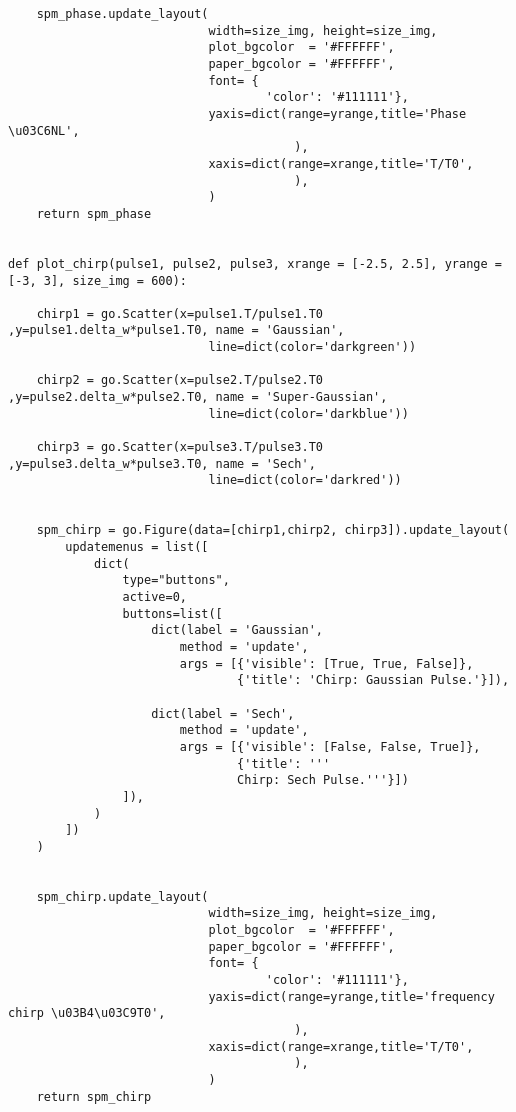 \begin{verbatim}
    spm_phase.update_layout( 
                            width=size_img, height=size_img,
                            plot_bgcolor  = '#FFFFFF',
                            paper_bgcolor = '#FFFFFF',
                            font= {
                                    'color': '#111111'},
                            yaxis=dict(range=yrange,title='Phase \u03C6NL', 
                                        ), 
                            xaxis=dict(range=xrange,title='T/T0', 
                                        ), 
                            )
    return spm_phase


def plot_chirp(pulse1, pulse2, pulse3, xrange = [-2.5, 2.5], yrange = [-3, 3], size_img = 600):

    chirp1 = go.Scatter(x=pulse1.T/pulse1.T0 ,y=pulse1.delta_w*pulse1.T0, name = 'Gaussian',
                            line=dict(color='darkgreen'))
    
    chirp2 = go.Scatter(x=pulse2.T/pulse2.T0 ,y=pulse2.delta_w*pulse2.T0, name = 'Super-Gaussian',
                            line=dict(color='darkblue'))

    chirp3 = go.Scatter(x=pulse3.T/pulse3.T0 ,y=pulse3.delta_w*pulse3.T0, name = 'Sech',
                            line=dict(color='darkred'))


    spm_chirp = go.Figure(data=[chirp1,chirp2, chirp3]).update_layout( 
        updatemenus = list([
            dict(
                type="buttons",
                active=0,
                buttons=list([   
                    dict(label = 'Gaussian',
                        method = 'update',
                        args = [{'visible': [True, True, False]},
                                {'title': 'Chirp: Gaussian Pulse.'}]), 

                    dict(label = 'Sech',
                        method = 'update',
                        args = [{'visible': [False, False, True]},
                                {'title': '''
                                Chirp: Sech Pulse.'''}])  
                ]),
            )
        ])
    )


    spm_chirp.update_layout( 
                            width=size_img, height=size_img,
                            plot_bgcolor  = '#FFFFFF',
                            paper_bgcolor = '#FFFFFF',
                            font= {
                                    'color': '#111111'},
                            yaxis=dict(range=yrange,title='frequency chirp \u03B4\u03C9T0', 
                                        ), 
                            xaxis=dict(range=xrange,title='T/T0', 
                                        ), 
                            )
    return spm_chirp


\end{verbatim}
